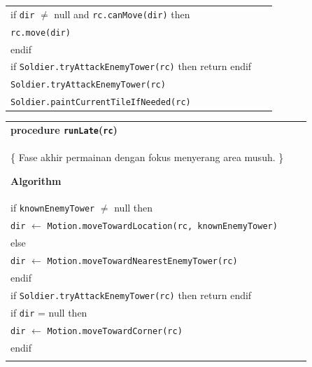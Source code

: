 \documentclass{article}
\newenvironment{pseudobox}
{
\centering
\begin{longtable}{|p{0.94\linewidth}|}
\hline
}
{
\\ \hline
\end{longtable}
\vspace{0.05cm}
}
\begin{document}
\begin{enumerate}[label=\alph*.]
\begin{pseudobox}
\hspace*{1.5em}if \texttt{dir} $\neq$ null and \texttt{rc.canMove(dir)} then \\
\hspace*{3em}\texttt{rc.move(dir)} \\
\hspace*{1.5em}endif \\

\hspace*{1.5em}if \texttt{Soldier.tryAttackEnemyTower(rc)} then return endif \\

\hspace*{1.5em}\texttt{Soldier.tryAttackEnemyTower(rc)} \\

\hspace*{1.5em}\texttt{Soldier.paintCurrentTileIfNeeded(rc)}

\end{pseudobox}
\begin{pseudobox}
\textbf{procedure \texttt{runLate}(\texttt{rc})} \\
\{ Fase akhir permainan dengan fokus menyerang area musuh. \}

\textbf{Algorithm} \\

\hspace*{1.5em}if \texttt{knownEnemyTower} $\neq$ null then \\
\hspace*{3em}\texttt{dir} $\leftarrow$ \texttt{Motion.moveTowardLocation(rc, knownEnemyTower)} \\
\hspace*{1.5em}else \\
\hspace*{3em}\texttt{dir} $\leftarrow$ \texttt{Motion.moveTowardNearestEnemyTower(rc)} \\
\hspace*{1.5em}endif \\

\hspace*{1.5em}if \texttt{Soldier.tryAttackEnemyTower(rc)} then return endif \\

\hspace*{1.5em}if \texttt{dir} = null then \\
\hspace*{3em}\texttt{dir} $\leftarrow$ \texttt{Motion.moveTowardCorner(rc)} \\
\hspace*{1.5em}endif \\


\end{pseudobox}
\end{enumerate}
\end{document}
